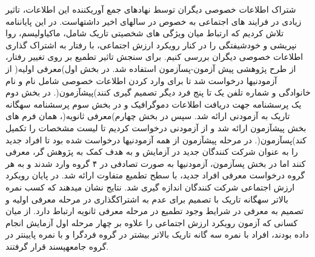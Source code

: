 \begin{latin}
شتراک اطلاعات خصوصی دیگران توسط نهادهای جمع آوریکننده این اطلاعات، تاثیر زیادی در فرایند های
اجتماعی به خصوص در سالهای اخیر داشتهاست. در این پایاننامه تلاش کردیم که ارتباط میان ویژگی های
شخصیتی تاریک شامل، ماکیاولیسم، روا نپریشی و خودشیفتگی را در کنار رویکرد ارزش اجتماعی، با رفتار
به اشتراک گذاری اطلاعات خصوصی دیگران بررسی کنیم. برای سنجش تاثیر تطمیع بر روی تغییر رفتار، از
طرح پژوهشی پیش آزمون-پسآزمون استفاده شد. در بخش اول)معرفی اولیه( از آزمودنیها درخواست شد تا
برای وارد کردن اطلاعات خصوصی شامل نام و نام خانوادگی و شماره تلفن یک تا پنج فرد دیگر تصمیم گیری
کنند)پیشآزمون(. در بخش دوم یک پرسشنامه جهت دریافت اطلاعات دموگرافیک و در بخش سوم پرسشنامه
سهگانه تاریک به آزمودنی ارائه شد. سپس در بخش چهارم)معرفی ثانویه(، همان فرم های بخش پیشآزمون ارائه
شد و از آزمودنی درخواست کردیم تا لیست مشخصات را تکمیل کند)پسآزمون(. در مرحله پیشآزمون از همه
آزمودنیها درخواست شده بود تا افراد جدید را به عنوان شرکت کنندگان جدید در آزمایش و به هدف کمک به
پژوهش گر، معرفی کنند اما در بخش پسآزمون، آزمودنیها به صورت تصادفی در ۴ گروه وارد شدند و به هر گروه
درخواست معرفی افراد جدید، با سطح تطمیع متفاوت ارائه شد. در پایان رویکرد ارزش اجتماعی شرکت کنندگان
اندازه گیری شد. نتایج نشان میدهند که کسب نمره بالاتر سهگانه تاریک با تصمیم برای عدم به اشتراکگذاری در
مرحله معرفی اولیه و تصمیم به معرفی در شرایط وجود تطمیع در مرحله معرفی ثانویه ارتباط دارد. از میان کسانی
که آزمون رویکرد ارزش اجتماعی را علاوه بر چهار مرحله اول آزمایش انجام داده بودند، افراد با نمره سه گانه
تاریک بالاتر بیشتر در گروه فردگرا و با نمره پایینتر در گروه جامعهپسند قرار گرفتند.
\latinTitlePage
\end{latin}
